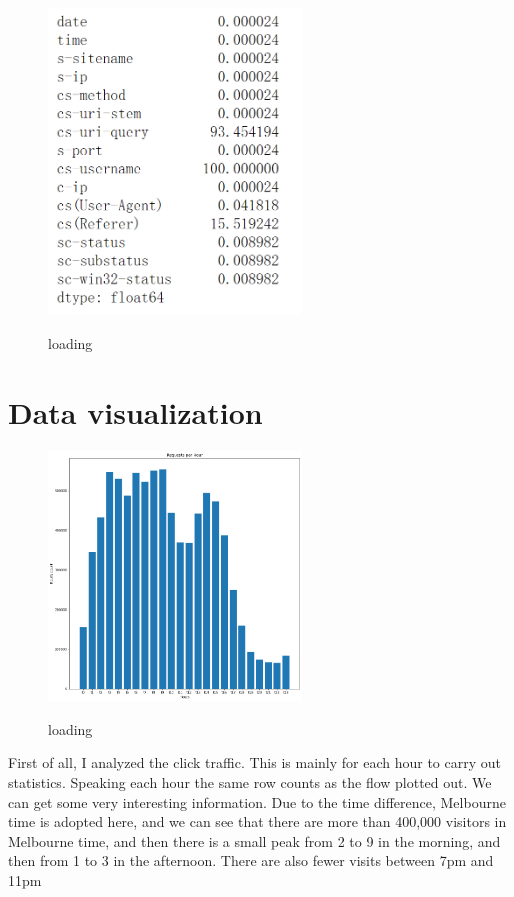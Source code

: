\documentclass{amsart}
\begin{document}
\begin{figure}
	\centering
	\includegraphics[width=0.6\textwidth]{Capture5.png}\\
	\caption{loading}\label{fig:loading}
\end{figure}

\section{Data  visualization }\label{sec-intro}

\begin{figure}
	\centering
	\includegraphics[width=0.6\textwidth]{ll1.png}\\
	\caption{loading}\label{fig:loading}
\end{figure}
First of all, I analyzed the click traffic.
This is mainly for each hour to carry out statistics.
Speaking each hour the same row counts as the flow plotted out.
We can get some very interesting information. Due to the time difference, Melbourne time is adopted here, and we can see that there are more than 400,000 visitors in Melbourne time, and then there is a small peak from 2 to 9 in the morning, and then from 1 to 3 in the afternoon.
There are also fewer visits between 7pm and 11pm
\end{document}
